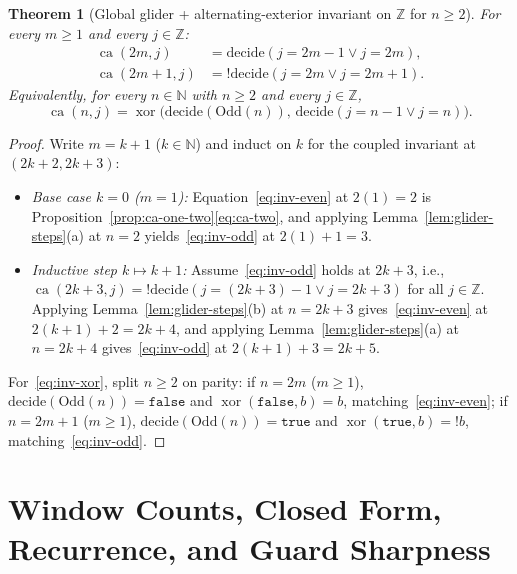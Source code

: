 \documentclass[11pt]{article}
\newtheorem{theorem}{Theorem}[section]
\theoremstyle{definition}
\newcommand{\N}{\mathbb{N}}
\newcommand{\Z}{\mathbb{Z}}
\newcommand{\ca}{\operatorname{ca}}
\begin{document}
\begin{theorem}[Global glider + alternating-exterior invariant on $\Z$ for $n \ge 2$]
\label{thm:global-inv}
For every $m \ge 1$ and every $j \in \Z$:
\begin{align}
\ca(2m, j) &= \mathrm{decide}(j = 2m - 1 \lor j = 2m), \label{eq:inv-even}\\
\ca(2m + 1, j) &= !\mathrm{decide}(j = 2m \lor j = 2m + 1). \label{eq:inv-odd}
\end{align}
Equivalently, for every $n \in \N$ with $n \ge 2$ and every $j \in \Z$,
\begin{equation}
\label{eq:inv-xor}
\ca(n, j) = \operatorname{xor}\bigl(\mathrm{decide}(\mathrm{Odd}(n)),\, \mathrm{decide}(j = n - 1 \lor j = n)\bigr).
\end{equation}
\end{theorem}

\begin{proof}
Write $m = k + 1$ ($k \in \N$) and induct on $k$ for the coupled invariant at $(2k + 2, 2k + 3)$:
\begin{itemize}
\item \emph{Base case $k = 0$ ($m = 1$):} Equation~\eqref{eq:inv-even} at $2(1) = 2$ is Proposition~\ref{prop:ca-one-two}\eqref{eq:ca-two}, and applying Lemma~\ref{lem:glider-steps}(a) at $n = 2$ yields~\eqref{eq:inv-odd} at $2(1) + 1 = 3$.
\item \emph{Inductive step $k \mapsto k + 1$:} Assume~\eqref{eq:inv-odd} holds at $2k + 3$, i.e., $\ca(2k + 3, j) = !\mathrm{decide}(j = (2k + 3) - 1 \lor j = 2k + 3)$ for all $j \in \Z$. Applying Lemma~\ref{lem:glider-steps}(b) at $n = 2k + 3$ gives~\eqref{eq:inv-even} at $2(k + 1) + 2 = 2k + 4$, and applying Lemma~\ref{lem:glider-steps}(a) at $n = 2k + 4$ gives~\eqref{eq:inv-odd} at $2(k + 1) + 3 = 2k + 5$.
\end{itemize}
For~\eqref{eq:inv-xor}, split $n \ge 2$ on parity: if $n = 2m$ ($m \ge 1$), $\mathrm{decide}(\mathrm{Odd}(n)) = \mathtt{false}$ and $\operatorname{xor}(\mathtt{false}, b) = b$, matching~\eqref{eq:inv-even}; if $n = 2m + 1$ ($m \ge 1$), $\mathrm{decide}(\mathrm{Odd}(n)) = \mathtt{true}$ and $\operatorname{xor}(\mathtt{true}, b) = !b$, matching~\eqref{eq:inv-odd}.
\end{proof}

\section{Window Counts, Closed Form, Recurrence, and Guard Sharpness}
\end{document}
